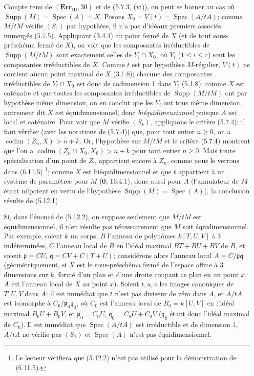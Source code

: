 Compte tenu de $(\mathbf{Err}_{\mathrm{III}},30)$ et de (5.7.3, (vi)), on peut
se borner au cas où $\operatorname{Supp}(M)=\operatorname{Spec}(A)=X$. Posons
$X_0=V(t)=\operatorname{Spec}(A/tA)$; comme $M/tM$ vérifie $(S_1)$ par
hypothèse, il n'a pas d'idéaux premiers associés immergés (5.7.5). Appliquant
(3.4.4) au point fermé de $X$ (et de tout sous-préschéma fermé de $X$), on
voit que les composantes irréductibles de $\operatorname{Supp}(M/tM)$ sont
exactement celles de $Y_i\cap X_0$, où $Y_i$ ($1\leq i\leq r$) sont les
composantes irréductibles de $X$. Comme $t$ est par hypothèse $M$-régulier,
$V(t)$ ne contient aucun point maximal de $X$ (3.1.8); chacune des composantes
irréductibles de $Y_i\cap X_0$ est donc de codimension 1 dans $Y_i$ (5.1.8);
comme $X$ est caténaire et que toutes les composantes irréductibles de
$\operatorname{Supp}(M/tM)$ ont par hypothèse même dimension, on en conclut
que les $Y_i$ ont tous même dimension, autrement dit $X$ est équidimensionnel,
donc \emph{biéquidimensionnel} puisque $A$ est local et caténaire. Pour voir que $M$
vérifie $(S_k)$, appliquons le critère (5.7.4): il faut vérifier (avec les
notations de (5.7.4)) que, pour tout entier $n\geq0$, on a
$\operatorname{codim}(Z_n,X)>n+k$. Or, l'hypothèse sur $M/tM$ et le critère
(5.7.4) montrent que l'on a
$\operatorname{codim}(Z_n\cap X_0,X_0)>n+k$ pour tout entier $n\geq0$. Mais
toute spécialisation d'un point de $Z_n$ appartient encore à $Z_n$, comme nous
le verrons dans (6.11.5)
\footnote{Le lecteur vérifiera que (5.12.2) n'est pas utilisé pour la
démonstration de (6.11.5).}; comme $X$ est biéquidimensionnel et que $t$
appartient à un système de paramètres pour $M$ (\textbf{0}, 16.4.1), donc aussi pour
$A$ (l'annulateur de $M$ étant nilpotent en vertu de l'hypothèse
$\operatorname{Supp}(M)=\operatorname{Spec}(A)$), la conclusion résulte de
(5.12.1).

\begin{remark}[5.12.3]
\label{IV.2.s5.12.3-fr}
Si, dans l'énoncé de (5.12.2), on suppose seulement que $M/tM$ est
équidimensionnel, il n'en résulte pas nécessairement que $M$ soit
équidimensionnel. Par exemple, soient $k$ un corps, $B$ l'anneau de polynômes
$k[T,U,V]$ à 3 indéterminées, $C$ l'anneau local de $B$ en l'idéal maximal
$BT+BU+BV$ de $B$, et soient $\mathfrak p=CU$,
$\mathfrak q=CV+C(T+U)$; considérons alors l'anneau local
$A=C/\mathfrak p\mathfrak q$ (géométriquement, si $X$ est le sous-préschéma
fermé de l'espace affine à 3 dimensions sur $k$, formé d'un plan et d'une
droite coupant ce plan en un point $x$, $A$ est l'anneau local de $X$ au point
$x$). Soient $t,u,v$ les images canoniques de $T,U,V$ dans $A$; il est
immédiat que $t$ n'est pas diviseur de zéro dans $A$, et $A/tA$ est isomorphe
à $C_0/\mathfrak p_0\mathfrak q_0$, où $C_0$ est l'anneau local de
$B_0=k[U,V]$ en l'idéal maximal $B_0U+B_0V$, et
$\mathfrak p_0=C_0U$, $\mathfrak q_0=C_0U+C_0V$ ($\mathfrak q_0$ étant donc
l'idéal maximal de $C_0$). Il est immédiat que $\operatorname{Spec}(A/tA)$
est irréductible et de dimension 1, $A/tA$ ne vérifie pas $(S_1)$ et
$\operatorname{Spec}(A)$ n'est pas équidimensionnel.
\end{remark}

